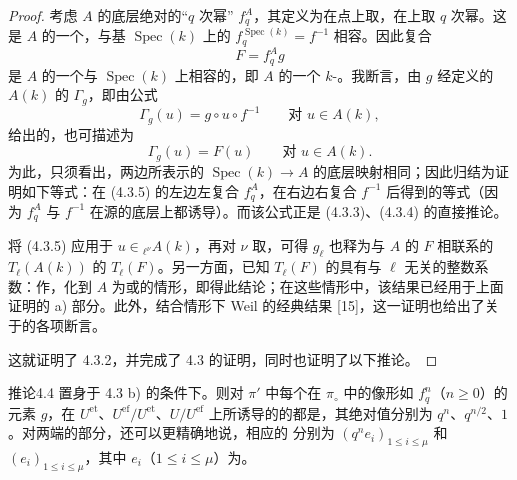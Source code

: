 \begin{proof}
考虑 $A$ 的底层绝对的“$q$ 次幂” $f_q^A$，其定义为在点上取，在上取 $q$ 次幂。这是 $A$ 的一个，与基 $\operatorname{Spec}(k)$ 上的 $f_q^{\operatorname{Spec}(k)}=f^{-1}$ 相容。因此复合
\[
 F=f_q^A g \tag{4.3.3}
\]
是 $A$ 的一个与 $\operatorname{Spec}(k)$ 上相容的，即 $A$ 的一个 $k$-。我断言，由 $g$ 经定义的 $A(k)$ 的 $\Gamma_g$，即由公式
\[
 \Gamma_g(u)=g\circ u\circ f^{-1}\qquad\text{对 }u\in A(k), \tag{4.3.4}
\]
给出的，也可描述为
\[
 \Gamma_g(u)=F(u)\qquad\text{对 }u\in A(k). \tag{4.3.5}
\]
为此，只须看出，两边所表示的 $\operatorname{Spec}(k)\to A$ 的底层映射相同；因此归结为证明如下等式：在 (4.3.5) 的左边左复合 $f_q^A$，在右边右复合 $f^{-1}$ 后得到的等式（因为 $f_q^A$ 与 $f^{-1}$ 在源的底层上都诱导）。而该公式正是 (4.3.3)、(4.3.4) 的直接推论。

将 (4.3.5) 应用于 $u\in{}_{\ell^\nu}A(k)$，再对 $\nu$ 取，可得 $g_\ell$ 也释为与 $A$ 的 $F$ 相联系的 $T_\ell(A(k))$ 的 $T_\ell(F)$。另一方面，已知 $T_\ell(F)$ 的具有与 $\ell$ 无关的整数系数：作，化到 $A$ 为或的情形，即得此结论；在这些情形中，该结果已经用于上面证明的 a) 部分。此外，结合情形下 Weil 的经典结果 [15]，这一证明也给出了关于的各项断言。

这就证明了 4.3.2，并完成了 4.3 的证明，同时也证明了以下推论。
\end{proof}
\begin{SGAresult}{推论}{4.4}
置身于 4.3 b) 的条件下。则对 $\pi'$ 中每个在 $\pi_\circ$ 中的像形如 $f_q^n$（$n\geq0$）的元素 $g$，在 $U^{\mathrm{et}}$、$U^{\mathrm{ef}}/U^{\mathrm{et}}$、$U/U^{\mathrm{ef}}$ 上所诱导的的都是，其绝对值分别为 $q^n$、$q^{n/2}$、$1$。对两端的部分，还可以更精确地说，相应的
分别为 $(q^ne_i)_{1\leq i\leq\mu}$ 和 $(e_i)_{1\leq i\leq\mu}$，其中 $e_i$（$1\leq i\leq\mu$）为。
\end{SGAresult}

